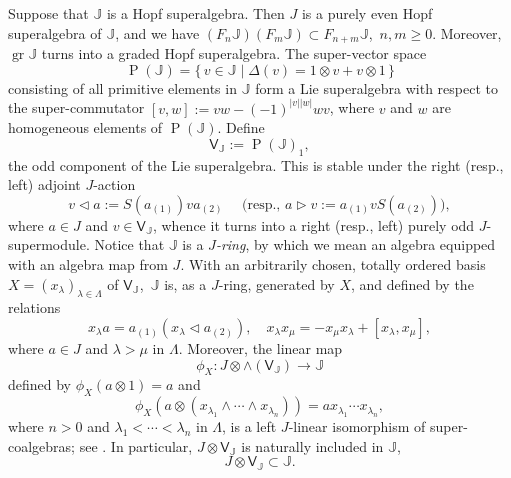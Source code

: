 \documentclass[11pt, a4paper]{amsart}
\theoremstyle{definition}
\numberwithin{equation}{section}
\begin{document}
Suppose that $\mathbb{J}$ is a Hopf superalgebra.
Then $J$ is a purely even Hopf superalgebra of $\mathbb{J}$, and we have $(F_{n}\mathbb{J})(F_{m}\mathbb{J}) \subset F_{n+m}\mathbb{J}$,\ $n,m \geq 0$.
Moreover, $\operatorname{gr}\mathbb{J}$ turns into a graded Hopf superalgebra.
The super-vector space
\begin{equation}\label{E26}
\operatorname{P}(\mathbb{J}) = \{\, v \in \mathbb{J} \mid \Delta(v) = 1 \otimes v + v \otimes 1 \, \}
\end{equation}
consisting of all primitive elements in $\mathbb{J}$ form a Lie superalgebra with respect to the super-commutator $[v,w] := vw - (-1)^{|v| |w|} wv$,
where $v$ and $w$ are homogeneous elements of 
$\operatorname{P}(\mathbb{J})$.
Define
\begin{equation}\label{E26a}
\mathsf{V}_{\mathbb{J}} := \operatorname{P}(\mathbb{J})_{1}, 
\end{equation}
the odd component of the Lie superalgebra.
This is stable under the right (resp., left) adjoint $J$-action
\begin{equation}\label{E27}
v \triangleleft a := S(a_{(1)}) v a_{(2)}\quad \text{ (resp., } a \triangleright v := a_{(1)} v S(a_{(2)})),
\end{equation}
where $a \in J$ and $v \in \mathsf{V}_{\mathbb{J}}$, whence it turns into a right (resp., left) purely odd $J$-supermodule.
Notice that $\mathbb{J}$ is a \emph{$J$-ring}, by which we mean an algebra equipped with an algebra map from $J$.
With an arbitrarily chosen, totally ordered basis $X=(x_{\lambda})_{\lambda \in \Lambda}$ of 
$\mathsf{V}_{\mathbb{J}}$,\
$\mathbb{J}$ is, as a $J$-ring, generated by $X$, and defined by the relations
\begin{equation}\label{E27a}
x_{\lambda}a = a_{(1)} (x_{\lambda} \triangleleft a_{(2)}),\quad x_{\lambda}x_{\mu} = -x_{\mu}x_{\lambda} + [x_{\lambda}, x_{\mu}], 
\end{equation}
where $a \in J$ and $\lambda > \mu$ in $\Lambda$.
Moreover, the linear map
\begin{equation}\label{E28}
\phi_{X}: J \otimes \wedge(\mathsf{V}_{\mathbb{J}}) \to \mathbb{J}
\end{equation}
defined by $\phi_{X}(a \otimes 1) = a$ and
\[ \phi_{X}(a \otimes (x_{\lambda_{1}} \wedge \cdots \wedge x_{\lambda_{n}})) = ax_{\lambda_{1}} \cdots x_{\lambda_{n}}, \]
where $n>0$ and $\lambda_{1} < \cdots < \lambda_{n}$ in $\Lambda$, is a left $J$-linear isomorphism of super-coalgebras; see \cite[Theorem 3.6]{M2}. In particular, $J \otimes \mathsf{V}_{\mathbb{J}}$ is naturally included in
$\mathbb{J}$,
\begin{equation}\label{E28a}
J \otimes \mathsf{V}_{\mathbb{J}}\subset \mathbb{J}. 
\end{equation}
\end{document}
